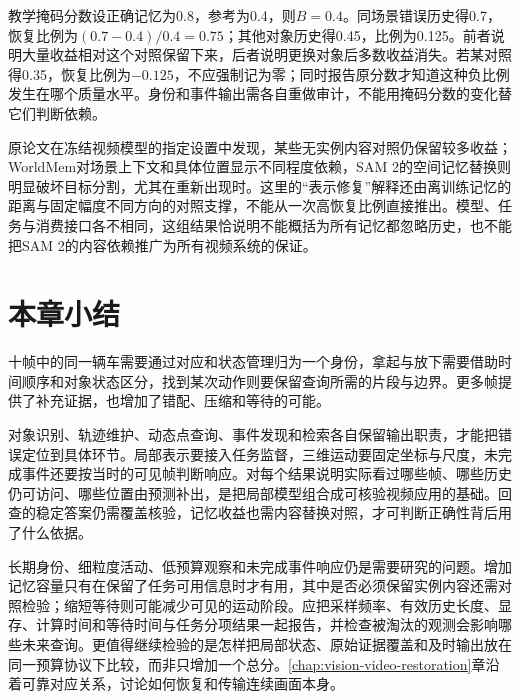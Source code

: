 教学掩码分数设正确记忆为0.8，参考为0.4，则$B=0.4$。同场景错误历史得0.7，恢复比例为$(0.7-0.4)/0.4=0.75$；其他对象历史得0.45，比例为0.125。前者说明大量收益相对这个对照保留下来，后者说明更换对象后多数收益消失。若某对照得0.35，恢复比例为$-0.125$，不应强制记为零；同时报告原分数才知道这种负比例发生在哪个质量水平。身份和事件输出需各自重做审计，不能用掩码分数的变化替它们判断依赖。

原论文在冻结视频模型的指定设置中发现，某些无实例内容对照仍保留较多收益；WorldMem对场景上下文和具体位置显示不同程度依赖，SAM 2的空间记忆替换则明显破坏目标分割，尤其在重新出现时。这里的“表示修复”解释还由离训练记忆的距离与固定幅度不同方向的对照支撑，不能从一次高恢复比例直接推出。模型、任务与消费接口各不相同，这组结果恰说明不能概括为所有记忆都忽略历史，也不能把SAM 2的内容依赖推广为所有视频系统的保证。

\section{本章小结}
\label{sec:vision-video-summary}

十帧中的同一辆车需要通过对应和状态管理归为一个身份，拿起与放下需要借助时间顺序和对象状态区分，找到某次动作则要保留查询所需的片段与边界。更多帧提供了补充证据，也增加了错配、压缩和等待的可能。

对象识别、轨迹维护、动态点查询、事件发现和检索各自保留输出职责，才能把错误定位到具体环节。局部表示要接入任务监督，三维运动要固定坐标与尺度，未完成事件还要按当时的可见帧判断响应。对每个结果说明实际看过哪些帧、哪些历史仍可访问、哪些位置由预测补出，是把局部模型组合成可核验视频应用的基础。回查的稳定答案仍需覆盖核验，记忆收益也需内容替换对照，才可判断正确性背后用了什么依据。

长期身份、细粒度活动、低预算观察和未完成事件响应仍是需要研究的问题。增加记忆容量只有在保留了任务可用信息时才有用，其中是否必须保留实例内容还需对照检验；缩短等待则可能减少可见的运动阶段。应把采样频率、有效历史长度、显存、计算时间和等待时间与任务分项结果一起报告，并检查被淘汰的观测会影响哪些未来查询。更值得继续检验的是怎样把局部状态、原始证据覆盖和及时输出放在同一预算协议下比较，而非只增加一个总分。\ref{chap:vision-video-restoration}章沿着可靠对应关系，讨论如何恢复和传输连续画面本身。
